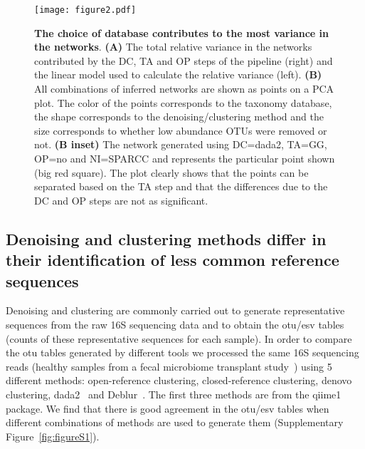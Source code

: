   \begin{figure}[H]
    \centering
    \texttt{[image: figure2.pdf]}
  \end{figure}
  \begin{figure}[!t]
    \centering
      \caption{
      \textbf{The choice of database contributes to the most variance in the networks}.
      \textbf{(A)} The total relative variance in the networks contributed by the DC, TA and OP steps of the pipeline (right) and the linear model used to calculate the relative variance (left).
      \textbf{(B)} All combinations of inferred networks are shown as points on a PCA plot.
      The color of the points corresponds to the taxonomy database, the shape corresponds to the denoising/clustering method and the size corresponds to whether low abundance OTUs were removed or not.
      \textbf{(B inset)} The network generated using DC=dada2, TA=GG, OP=no and NI=SPARCC and represents the particular point shown (big red square).
      The plot clearly shows that the points can be separated based on the TA step and that the differences due to the DC and OP steps are not as significant.
    }
    \label{fig:figure2}
  \end{figure}


  \FloatBarrier

  \subsection*{Denoising and clustering methods differ in their identification of less common reference sequences}

  Denoising and clustering are commonly carried out to generate representative sequences from the raw 16S sequencing data and to obtain the \ac{otu}/\ac{esv} tables (counts of these representative sequences for each sample).
  In order to compare the \ac{otu} tables generated by different tools we processed the same 16S sequencing reads (healthy samples from a fecal microbiome transplant study~\cite{Kang2017}) using 5 different methods:  open-reference clustering, closed-reference clustering, denovo clustering, \ac{dada2}~\cite{Callahan2016} and Deblur~\cite{Amir2017}.
  The first three methods are from the \ac{qiime1}~\cite{Caporaso2010} package.
  We find that there is good agreement in the \ac{otu}/\ac{esv} tables when different combinations of methods are used to generate them (Supplementary Figure~\ref{fig:figureS1}).

